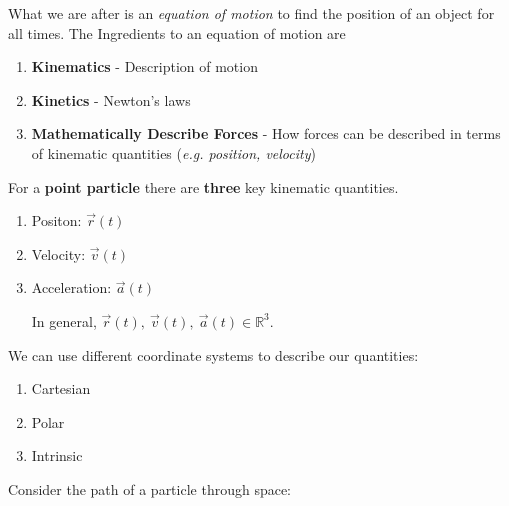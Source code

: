 \documentclass[10pt]{scrartcl}
\begin{document}
\TableofContents

\setcounter{section}{-1}
\addtocounter{lecture}{-1}
\setcounter{page}{3}

What we are after is an \emph{equation of motion} to find the position of an object for all times. The Ingredients to an equation of motion are

\begin{enumerate}[1)]
\item \textbf{Kinematics} - Description of motion 
\item \textbf{Kinetics} - Newton's laws
\item \textbf{Mathematically Describe Forces} - How forces can be described in terms of kinematic quantities (\textit{e.g. position, velocity})
\end{enumerate}





For a \textbf{point particle} there are \textbf{three} key kinematic quantities.\begin{enumerate}[1)]
\item Positon: $\vec{r}(t)$
\item Velocity: $\vec{v}(t)$
\item Acceleration: $\vec{a}(t)$

In general, $\vec{r}(t),~\vec{v}(t),~\vec{a}(t) \in \mathbb{R}^3$. 
\end{enumerate}\vspace*{5pt}


We can use different coordinate systems to describe our quantities:
\begin{enumerate}[1)]
\item Cartesian
\item Polar
\item Intrinsic	
\end{enumerate}

Consider the path of a particle through space:
\end{document}
